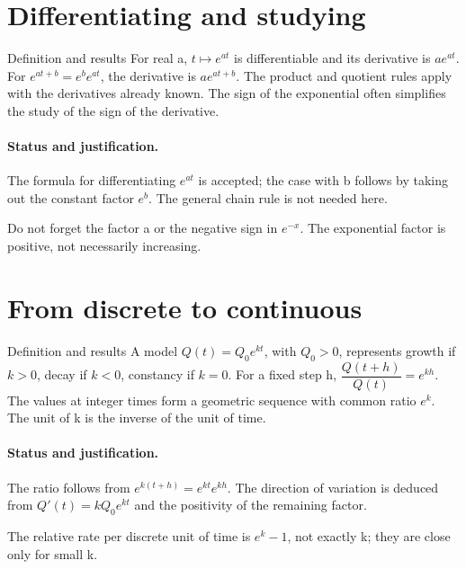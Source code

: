 \section{Differentiating and studying}\label{C09-U3}
\begin{repere}{Definition and results}
For real a, $t\mapsto e^{at}$ is differentiable and its derivative is $ae^{at}$. For $e^{at+b}=e^be^{at}$, the derivative is $ae^{at+b}$. The product and quotient rules apply with the derivatives already known. The sign of the exponential often simplifies the study of the sign of the derivative.
\end{repere}
\paragraph{Status and justification.} The formula for differentiating $e^{at}$ is accepted; the case with b follows by taking out the constant factor $e^b$. The general chain rule is not needed here.
\label{C09-EX3}
\begin{erreur}Do not forget the factor a or the negative sign in $e^{-x}$. The exponential factor is positive, not necessarily increasing.\end{erreur}
\label{C09-AP3}
\section{From discrete to continuous}\label{C09-U4}
\begin{repere}{Definition and results}
A model $Q(t)=Q_0e^{kt}$, with $Q_0>0$, represents growth if $k>0$, decay if $k<0$, constancy if $k=0$. For a fixed step h, $\dfrac{Q(t+h)}{Q(t)}=e^{kh}$. The values at integer times form a geometric sequence with common ratio $e^k$. The unit of k is the inverse of the unit of time.
\end{repere}
\paragraph{Status and justification.} The ratio follows from $e^{k(t+h)}=e^{kt}e^{kh}$. The direction of variation is deduced from $Q\prime(t)=kQ_0e^{kt}$ and the positivity of the remaining factor.
\label{C09-EX4}

\begin{erreur}The relative rate per discrete unit of time is $e^k-1$, not exactly k; they are close only for small k.\end{erreur}
\label{C09-AP4}
